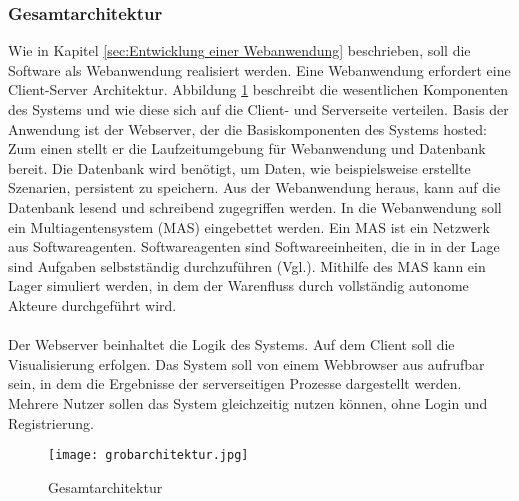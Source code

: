 \subsubsection{Gesamtarchitektur}
Wie in Kapitel \ref{sec:Entwicklung einer Webanwendung} beschrieben, soll die Software als Webanwendung realisiert werden. Eine Webanwendung erfordert eine Client-Server Architektur. Abbildung \ref{Gesamtarchitektur} beschreibt die wesentlichen Komponenten des Systems und wie diese sich auf die Client- und Serverseite verteilen. Basis der Anwendung ist der Webserver, der die Basiskomponenten des Systems hosted: Zum einen stellt er die Laufzeitumgebung für Webanwendung und Datenbank bereit. Die Datenbank wird benötigt, um Daten, wie beispielsweise erstellte Szenarien, persistent zu speichern. Aus der Webanwendung heraus, kann auf die Datenbank lesend und schreibend zugegriffen werden. In die Webanwendung soll ein Multiagentensystem (MAS) eingebettet werden. Ein MAS ist ein Netzwerk aus Softwareagenten. Softwareagenten sind Softwareeinheiten, die in in der Lage sind Aufgaben selbstständig durchzuführen (Vgl.\cite{mas}). Mithilfe des MAS kann ein Lager simuliert werden, in dem der Warenfluss durch vollständig autonome Akteure durchgeführt wird. 
\\\\
Der Webserver beinhaltet die Logik des Systems. Auf dem Client soll die Visualisierung erfolgen. Das System soll von einem Webbrowser aus aufrufbar sein, in dem die Ergebnisse der serverseitigen Prozesse dargestellt werden. Mehrere Nutzer sollen das System gleichzeitig nutzen können, ohne Login und Registrierung.

\begin{figure}[h!]
	\centering
		\texttt{[image: grobarchitektur.jpg]}        
		\caption{Gesamtarchitektur}
	\label{Gesamtarchitektur}
\end{figure} 

